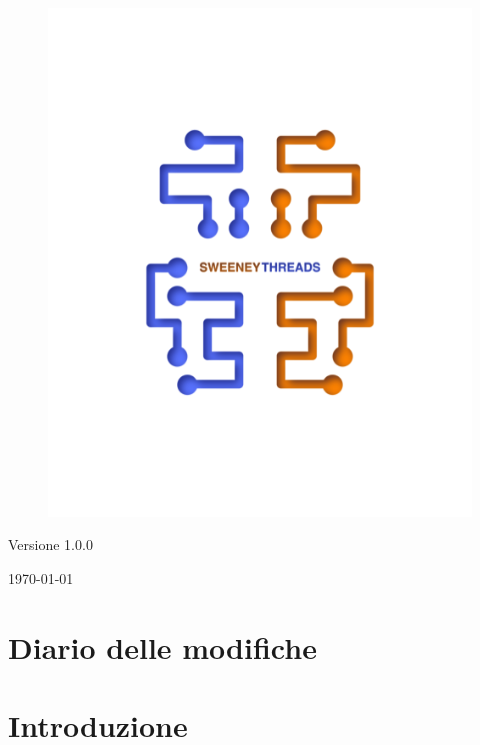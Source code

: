 \documentclass[a4paper]{article}
\begin{document}
\begin{titlepage}
		\begin{figure}[H]
			\centering
			\includegraphics[scale=0.8]{sweeney.png}
		\end{figure}
		\begin{center}
			Versione 1.0.0
		\end{center}
		{\large \today}\\[3cm] 
		\vfill  
	\end{titlepage}
	
	
	\tableofcontents
	
	\newpage
	\section*{Diario delle modifiche}

	\newpage 
    \section{Introduzione}
\end{document}
